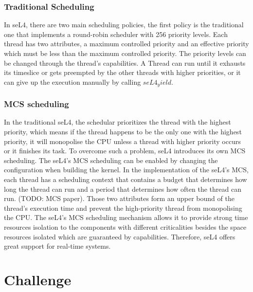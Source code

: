 \subsubsection{Traditional Scheduling}

In seL4, there are two main scheduling policies, the first policy is the traditional one that implements a round-robin scheduler with 256 priority levels. Each thread has two attributes, a maximum controlled priority and an effective priority which must be less than the maximum controlled priority. The priority levels can be changed through the thread's capabilities. A Thread can run until it exhausts its timeslice or gets preempted by the other threads with higher priorities, or it can give up the execution manually by calling $seL4_yield$.

\subsubsection{MCS scheduling}

In the traditional seL4, the schedular prioritizes the thread with the highest priority, which means if the thread happens to be the only one with the highest priority, it will monopolise the CPU unless a thread with higher priority occurs or it finishes its task. To overcome such a problem, seL4 introduces its own MCS scheduling. The seL4's MCS scheduling can be enabled by changing the configuration when building the kernel. In the implementation of the seL4's MCS, each thread has a scheduling context that contains a budget that determines how long the thread can run and a period that determines how often the thread can run. (TODO: MCS paper). Those two attributes form an upper bound of the thread's execution time and prevent the high-priority thread from monopolising the CPU. The seL4's MCS scheduling mechanism allows it to provide strong time resources isolation to the components with different criticalities besides the space resources isolated which are guaranteed by capabilities. Therefore, seL4 offers great support for real-time systems.

\section{Challenge}

